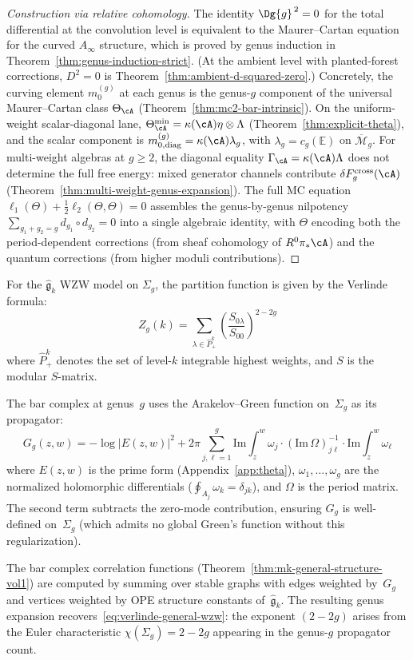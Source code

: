 \begin{proof}[Construction via relative cohomology]
The identity $\Dg{g}^{\,2} = 0$ for the total differential at the convolution level is equivalent to the Maurer--Cartan equation for the curved $A_\infty$ structure, which is proved by genus induction in Theorem~\ref{thm:genus-induction-strict}. (At the ambient level with planted-forest corrections, $D^2 = 0$ is Theorem~\ref{thm:ambient-d-squared-zero}.)
Concretely, the curving element $m_0^{(g)}$ at each genus is the
genus-$g$ component of the universal Maurer--Cartan class
$\Theta_\cA$
(Theorem~\ref{thm:mc2-bar-intrinsic}). On the uniform-weight
scalar-diagonal lane,
$\Theta_\cA^{\min}=\kappa(\cA)\eta\otimes\Lambda$
(Theorem~\ref{thm:explicit-theta}), and the scalar component is
$m_{0,\mathrm{diag}}^{(g)}=\kappa(\cA)\lambda_g$, with
$\lambda_g=c_g(\mathbb{E})$ on $\overline{\mathcal{M}}_g$.
For multi-weight algebras at $g\geq2$, the diagonal equality
$\Gamma_\cA=\kappa(\cA)\Lambda$ does not determine the full free
energy: mixed generator channels contribute
$\delta F_g^{\mathrm{cross}}(\cA)$
(Theorem~\ref{thm:multi-weight-genus-expansion}). The full MC equation
$\ell_1(\Theta) + \tfrac{1}{2}\ell_2(\Theta,\Theta) = 0$ assembles
the genus-by-genus nilpotency $\sum_{g_1+g_2=g} d_{g_1} \circ d_{g_2}
= 0$ into a single algebraic identity, with $\Theta$ encoding both
the period-dependent corrections (from sheaf cohomology of
$R^0\pi_*\cA$) and the quantum corrections (from higher moduli
contributions).
\end{proof}

\begin{example}
For the $\widehat{\mathfrak{g}}_k$ WZW model on $\Sigma_g$, the partition function is given by the Verlinde formula:
\begin{equation}\label{eq:verlinde-general-wzw}
Z_g(k) = \sum_{\lambda \in \hat{P}_+^k} \left(\frac{S_{0\lambda}}{S_{00}}\right)^{2-2g}
\end{equation}
where $\hat{P}_+^k$ denotes the set of level-$k$ integrable highest weights, and $S$ is the modular $S$-matrix.

The bar complex at genus~$g$ uses the Arakelov--Green function on~$\Sigma_g$ as its propagator:
\[G_g(z,w) = -\log|E(z,w)|^2 + 2\pi\sum_{j,\ell=1}^g \mathrm{Im}\!\int_z^w \omega_j \cdot (\mathrm{Im}\,\Omega)^{-1}_{j\ell} \cdot \mathrm{Im}\!\int_z^w \omega_\ell\]
where $E(z,w)$ is the prime form (Appendix~\ref{app:theta}), $\omega_1, \ldots, \omega_g$ are the normalized holomorphic differentials ($\oint_{A_j}\omega_k = \delta_{jk}$), and $\Omega$ is the period matrix. The second term subtracts the zero-mode contribution, ensuring $G_g$ is well-defined on~$\Sigma_g$ (which admits no global Green's function without this regularization).

The bar complex correlation functions (Theorem~\ref{thm:mk-general-structure-vol1}) are computed by summing over stable graphs with edges weighted by~$G_g$ and vertices weighted by OPE structure constants of~$\widehat{\mathfrak{g}}_k$. The resulting genus expansion recovers~\eqref{eq:verlinde-general-wzw}: the exponent $(2-2g)$ arises from the Euler characteristic $\chi(\Sigma_g) = 2 - 2g$ appearing in the genus-$g$ propagator count.
\end{example}

